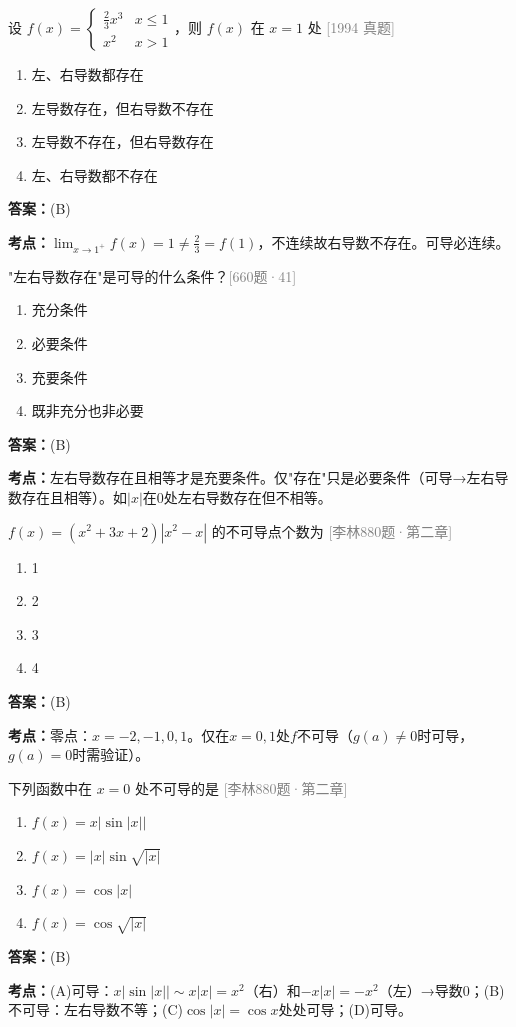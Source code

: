 \documentclass[12pt,a4paper]{ctexbook}
\newcommand{\src}[1]{\hfill\textcolor{gray}{\small\textsf{[#1]}}}
\newcommand{\ans}[1]{\begin{answerbox}\textbf{答案：}#1\end{answerbox}}
\newcommand{\kpt}[1]{\textbf{考点：}#1}
\begin{document}
\begin{exercise}[1994 数学二·真题]
设 $f(x)=\begin{cases}\frac{2}{3}x^3 & x\leqslant 1\\ x^2 & x>1\end{cases}$，则 $f(x)$ 在 $x=1$ 处 \hfill\src{1994 真题}
\begin{enumerate}[label=(\Alph*),nosep]
  \item 左、右导数都存在
  \item 左导数存在，但右导数不存在
  \item 左导数不存在，但右导数存在
  \item 左、右导数都不存在
\end{enumerate}
\end{exercise}
\ans{(B)}
\kpt{$\lim_{x\to 1^+}f(x)=1\neq\frac{2}{3}=f(1)$，不连续故右导数不存在。可导必连续。}

\bigskip

\begin{exercise}[660题·左右导数存在与可导·41题]
"左右导数存在"是可导的什么条件？\hfill\src{660题·41}
\begin{enumerate}[label=(\Alph*),nosep]
  \item 充分条件
  \item 必要条件
  \item 充要条件
  \item 既非充分也非必要
\end{enumerate}
\end{exercise}
\ans{(B)}
\kpt{左右导数存在且相等才是充要条件。仅"存在"只是必要条件（可导→左右导数存在且相等）。如$|x|$在0处左右导数存在但不相等。}

\bigskip

\begin{exercise}[880题·不可导点个数]
$f(x)=(x^2+3x+2)|x^2-x|$ 的不可导点个数为 \hfill\src{李林880题·第二章}
\begin{enumerate}[label=(\Alph*),nosep]
  \item 1
  \item 2
  \item 3
  \item 4
\end{enumerate}
\end{exercise}
\ans{(B)}
\kpt{零点：$x=-2,-1,0,1$。仅在$x=0,1$处$f$不可导（$g(a)\neq 0$时可导，$g(a)=0$时需验证）。}

\bigskip

\begin{exercise}[880题·不可导点·第5题]
下列函数中在 $x=0$ 处不可导的是 \hfill\src{李林880题·第二章}
\begin{enumerate}[label=(\Alph*),nosep]
  \item $f(x)=x|\sin|x||$
  \item $f(x)=|x|\sin\sqrt{|x|}$
  \item $f(x)=\cos|x|$
  \item $f(x)=\cos\sqrt{|x|}$
\end{enumerate}
\end{exercise}
\ans{(B)}
\kpt{(A)可导：$x|\sin|x||\sim x|x|=x^2$（右）和$-x|x|=-x^2$（左）→导数0；(B)不可导：左右导数不等；(C)$\cos|x|=\cos x$处处可导；(D)可导。}
\end{document}
